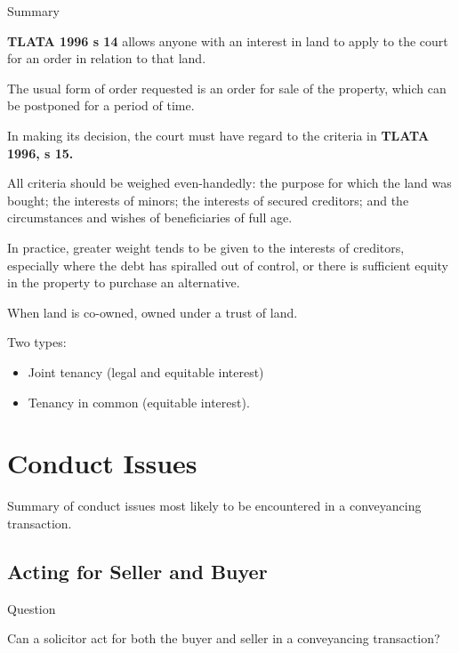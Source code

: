 \documentclass[
]{article}
\providecommand{\tightlist}{%
  \setlength{\itemsep}{0pt}\setlength{\parskip}{0pt}}
\newenvironment{env-d6ce83a0-f7a8-46b6-be95-b1235f1feb63}
{
    \savenotes\tcolorbox[blanker,breakable,left=5pt,borderline west={2pt}{-4pt}{gray}]
}
{
    \endtcolorbox\spewnotes
}
\begin{document}
\begin{env-d6ce83a0-f7a8-46b6-be95-b1235f1feb63}

Summary

\textbf{TLATA 1996 s 14} allows anyone with an interest in land to apply
to the court for an order in relation to that land.

The usual form of order requested is an order for sale of the property,
which can be postponed for a period of time.

In making its decision, the court must have regard to the criteria in
\textbf{TLATA 1996, s 15.}

All criteria should be weighed even-handedly: the purpose for which the
land was bought; the interests of minors; the interests of secured
creditors; and the circumstances and wishes of beneficiaries of full
age.

In practice, greater weight tends to be given to the interests of
creditors, especially where the debt has spiralled out of control, or
there is sufficient equity in the property to purchase an alternative.

\end{env-d6ce83a0-f7a8-46b6-be95-b1235f1feb63}

When land is co-owned, owned under a trust of land.

Two types:

\begin{itemize}
\tightlist
\item
  Joint tenancy (legal and equitable interest)
\item
  Tenancy in common (equitable interest).
\end{itemize}

\hypertarget{conduct-issues}{%
\section{Conduct Issues}\label{conduct-issues}}

Summary of conduct issues most likely to be encountered in a
conveyancing transaction.

\hypertarget{acting-for-seller-and-buyer}{%
\subsection{Acting for Seller and
Buyer}\label{acting-for-seller-and-buyer}}

\begin{env-d6ce83a0-f7a8-46b6-be95-b1235f1feb63}

Question

Can a solicitor act for both the buyer and seller in a conveyancing
transaction?

\end{env-d6ce83a0-f7a8-46b6-be95-b1235f1feb63}
\end{document}
